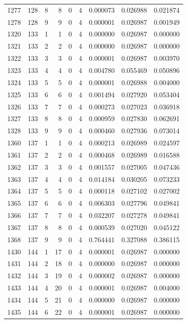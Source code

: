 \begin{longtable}{rrrrrrrrr}
1277 & 128 & 8 & 8 & 0 & 4 & 0.000073 & 0.026988 & 0.021874 \\
1278 & 128 & 9 & 9 & 0 & 4 & 0.000001 & 0.026987 & 0.001949 \\
1320 & 133 & 1 & 1 & 0 & 4 & 0.000000 & 0.026987 & 0.000000 \\
1321 & 133 & 2 & 2 & 0 & 4 & 0.000000 & 0.026987 & 0.000000 \\
1322 & 133 & 3 & 3 & 0 & 4 & 0.000001 & 0.026987 & 0.003970 \\
1323 & 133 & 4 & 4 & 0 & 4 & 0.004780 & 0.055469 & 0.050896 \\
1324 & 133 & 5 & 5 & 0 & 4 & 0.000001 & 0.026988 & 0.004000 \\
1325 & 133 & 6 & 6 & 0 & 4 & 0.001494 & 0.027920 & 0.053404 \\
1326 & 133 & 7 & 7 & 0 & 4 & 0.000273 & 0.027023 & 0.036918 \\
1327 & 133 & 8 & 8 & 0 & 4 & 0.000959 & 0.027830 & 0.062691 \\
1328 & 133 & 9 & 9 & 0 & 4 & 0.000460 & 0.027936 & 0.073014 \\
1360 & 137 & 1 & 1 & 0 & 4 & 0.000213 & 0.026989 & 0.024597 \\
1361 & 137 & 2 & 2 & 0 & 4 & 0.000468 & 0.026989 & 0.016588 \\
1362 & 137 & 3 & 3 & 0 & 4 & 0.001557 & 0.027005 & 0.047436 \\
1363 & 137 & 4 & 4 & 0 & 4 & 0.014184 & 0.030205 & 0.073233 \\
1364 & 137 & 5 & 5 & 0 & 4 & 0.000118 & 0.027102 & 0.027002 \\
1365 & 137 & 6 & 6 & 0 & 4 & 0.006303 & 0.027796 & 0.049841 \\
1366 & 137 & 7 & 7 & 0 & 4 & 0.032207 & 0.027278 & 0.049841 \\
1367 & 137 & 8 & 8 & 0 & 4 & 0.000539 & 0.027020 & 0.045122 \\
1368 & 137 & 9 & 9 & 0 & 4 & 0.764441 & 0.327088 & 0.386115 \\
1430 & 144 & 1 & 17 & 0 & 4 & 0.000001 & 0.026987 & 0.000000 \\
1431 & 144 & 2 & 18 & 0 & 4 & 0.000000 & 0.026987 & 0.000000 \\
1432 & 144 & 3 & 19 & 0 & 4 & 0.000002 & 0.026987 & 0.000000 \\
1433 & 144 & 4 & 20 & 0 & 4 & 0.000001 & 0.026987 & 0.004000 \\
1434 & 144 & 5 & 21 & 0 & 4 & 0.000000 & 0.026987 & 0.000000 \\
1435 & 144 & 6 & 22 & 0 & 4 & 0.000001 & 0.026987 & 0.000000 \\

\end{longtable}

